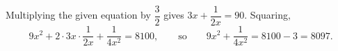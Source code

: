 Multiplying the given equation by $\dfrac32$ gives $3x+\dfrac{1}{2x}=90$. Squaring,
\[9x^2+2\cdot3x\cdot\dfrac1{2x}+\dfrac1{4x^2}=8100,\qquad\text{so}\qquad9x^2+\dfrac{1}{4x^2}=8100-3=\boxed{8097}.\]
